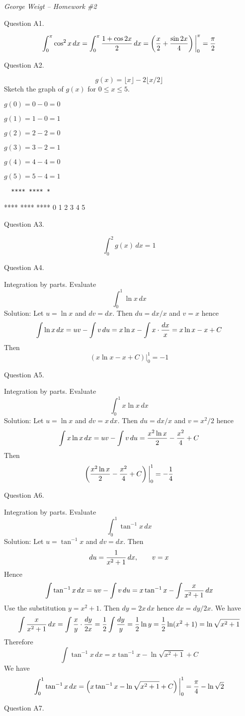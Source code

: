 {\it George Weigt -- Homework \#2}

\beginsection Question A1.

$$\int_0^\pi\cos^2x\,dx=\int_0^\pi{1+\cos2x\over2}\,dx
=\left({x\over2}+{\sin 2x\over4}\right)\bigg|_0^\pi
={\pi\over2}$$

\beginsection Question A2.

$$g(x)=\lfloor x\rfloor-2\lfloor x/2\rfloor$$
Sketch the graph of $g(x)$ for $0\le x\le5$.

$g(0)=0-0=0$

$g(1)=1-0=1$

$g(2)=2-2=0$

$g(3)=3-2=1$

$g(4)=4-4=0$

$g(5)=5-4=1$

{\obeylines\obeyspaces\tt
\    ****    ****    *


****    ****    ****
0   1   2   3   4   5
}

\beginsection Question A3.

$$\int_0^2g(x)\,dx=1$$

\beginsection Question A4.

Integration by parts. Evaluate
$$\int_0^1\ln x\,dx$$
\medskip
Solution: Let $u=\ln x$ and $dv=dx$. Then $du=dx/x$ and $v=x$ hence
$$\int\ln x\,dx=uv-\int v\,du=x\ln x-\int x\cdot{dx\over x}=x\ln x-x+C$$
Then
$$(x\ln x-x+C)\bigg|_0^1=-1$$

\beginsection Question A5.

Integration by parts. Evaluate
$$\int_0^1x\ln x\,dx$$
\medskip
Solution: Let $u=\ln x$ and $dv=x\,dx$.
Then $du=dx/x$ and $v=x^2/2$ hence
$$\int x\ln x\,dx=uv-\int v\,du={x^2\ln x\over2}-{x^2\over4}+C$$
Then
$$\left({x^2\ln x\over2}-{x^2\over4}+C\right)\bigg|_0^1=-{1\over4}$$

\beginsection Question A6.

Integration by parts. Evaluate
$$\int_0^1\tan^{-1}x\,dx$$
\medskip
Solution: Let $u=\tan^{-1}x$ and $dv=dx$.
Then
$$du={1\over x^2+1}\,dx,\qquad v=x$$
Hence
$$\int\tan^{-1}x\,dx=uv-\int v\,du=x\tan^{-1}x-\int{x\over x^2+1}\,dx$$
Use the substitution $y=x^2+1$. Then $dy=2x\,dx$ hence $dx=dy/2x$.
We have
$$\int{x\over x^2+1}\,dx=\int{x\over y}\cdot{dy\over2x}
={1\over2}\int {dy\over y}={1\over2}\ln y={1\over2}\ln(x^2+1)=\ln\sqrt{x^2+1}$$
Therefore
$$\int\tan^{-1}x\,dx=x\tan^{-1}x-\ln\sqrt{x^2+1}+C$$
We have
$$\int_0^1\tan^{-1}x\,dx=\left(x\tan^{-1}x-\ln\sqrt{x^2+1}+C\right)\bigg|_0^1
={\pi\over4}-\ln \sqrt2$$

\beginsection Question A7.

